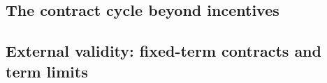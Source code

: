 \documentclass{article}
\begin{document}

\subsection{The contract cycle beyond incentives}
\label{sec:discussion-socialscience}


\subsection{External validity: fixed-term contracts and term limits}

\end{document}

